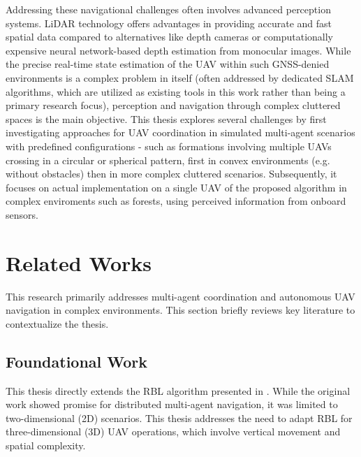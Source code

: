 Addressing these navigational challenges often involves advanced perception systems. 
\ac{LiDAR} technology offers advantages in providing accurate and fast spatial data compared to alternatives like depth cameras or computationally expensive neural network-based depth estimation from monocular images. 
While the precise real-time state estimation of the \ac{UAV} within such \ac{GNSS}-denied environments is a complex problem in itself (often addressed by dedicated \ac{SLAM} algorithms, which are utilized as existing tools in this work rather than being a primary research focus), perception and navigation through complex cluttered spaces is the main objective.
This thesis explores several challenges by first investigating approaches for \ac{UAV} coordination in simulated multi-agent scenarios with predefined configurations - such as formations involving multiple \ac{UAV}s crossing in a circular or spherical pattern, first in convex environments (e.g. without obstacles) then in more complex cluttered scenarios. 
Subsequently, it focuses on actual implementation on a single \ac{UAV} of the proposed algorithm in complex enviroments such as forests, using perceived information from onboard sensors.

\section{Related Works}

  This research primarily addresses multi-agent coordination and autonomous \ac{UAV} navigation in complex environments. 
  This section briefly reviews key literature to contextualize the thesis.
  \subsection{Foundational Work}
    This thesis directly extends the \ac{RBL} algorithm presented in \cite{rbl_paper}. 
    While the original work showed promise for distributed multi-agent navigation, it was limited to two-dimensional (2D) scenarios. 
    This thesis addresses the need to adapt \ac{RBL} for three-dimensional (3D) \ac{UAV} operations, which involve vertical movement and spatial complexity.

